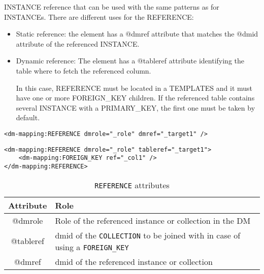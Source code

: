 INSTANCE reference that can be used with the same patterns as for INSTANCEs.
There are different uses for the REFERENCE:

\begin{itemize}
    \item Static reference: the element has a @dmref attribute that matches the @dmid attribute of the referenced INSTANCE.
    \item Dynamic reference: The element has a @tableref attribute identifying  the table where to fetch the referenced column. 
    
             In this case, REFERENCE must be located in a TEMPLATES and it must have one or more FOREIGN\_KEY children. 
             If the referenced table contains several INSTANCE with a PRIMARY\_KEY, the first one must be taken by default.
\end{itemize}

\begin{lstlisting}[frame=single,caption={Simple \texttt{REFERENCE}, to be replaced with the INSTANCE having @dmid=\_target1 },style=XML,basicstyle=\tiny]
<dm-mapping:REFERENCE dmrole="_role" dmref="_target1" />
\end{lstlisting}

\begin{lstlisting}[frame=single,caption={Dynamic \texttt{REFERENCE}, to be replaced with the INSTANCE of the table of collection \_target1 and having a PRIMARY\_KEY matching the value of column  \_col1. This pattern is valid in the context of a TEMPLATES},style=XML,basicstyle=\tiny]
<dm-mapping:REFERENCE dmrole="_role" tableref="_target1">
    <dm-mapping:FOREIGN_KEY ref="_col1" />
</dm-mapping:REFERENCE>
\end{lstlisting}

\begin{table}[!htbp]
\small
\centering
\begin{tabulary}{\linewidth}{|c|J|}       
       \hline 
            \textbf{Attribute} & 
            \textbf {Role}\\
       \hline         \hline  
            @dmrole & 
            Role of the referenced instance or collection in the DM \\
        \hline 
            @tableref& 
            dmid of the \texttt{COLLECTION} to be joined with in case of using a \texttt{FOREIGN\_KEY} \\
        \hline 
            @dmref & 
            dmid of the referenced instance or collection\\
        \hline 
     \end{tabulary}
     \caption{\texttt{REFERENCE} attributes} 
     \label{tbl:reference-att}
 \end{table}

